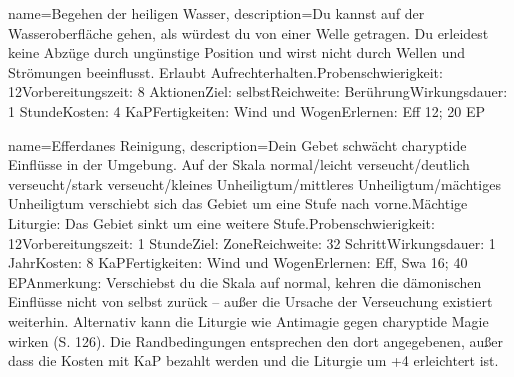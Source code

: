 {
    name={Begehen der heiligen Wasser},
    description={Du kannst auf der Wasseroberfläche gehen, als würdest du von einer Welle getragen. Du erleidest keine Abzüge durch ungünstige Position und wirst nicht durch Wellen und Strömungen beeinflusst. Erlaubt Aufrechterhalten.\newline Probenschwierigkeit: 12\newline Vorbereitungszeit: 8 Aktionen\newline Ziel: selbst\newline Reichweite: Berührung\newline Wirkungsdauer: 1 Stunde\newline Kosten: 4 KaP\newline Fertigkeiten: Wind und Wogen\newline Erlernen: Eff 12; 20 EP}
}


{
    name={Efferdanes Reinigung},
    description={Dein Gebet schwächt charyptide Einflüsse in der Umgebung. Auf der Skala normal/leicht verseucht/deutlich verseucht/stark verseucht/kleines Unheiligtum/mittleres Unheiligtum/mächtiges Unheiligtum verschiebt sich das Gebiet um eine Stufe nach vorne.\newline Mächtige Liturgie: Das Gebiet sinkt um eine weitere Stufe.\newline Probenschwierigkeit: 12\newline Vorbereitungszeit: 1 Stunde\newline Ziel: Zone\newline Reichweite: 32 Schritt\newline Wirkungsdauer: 1 Jahr\newline Kosten: 8 KaP\newline Fertigkeiten: Wind und Wogen\newline Erlernen: Eff, Swa 16; 40 EP\newline Anmerkung: Verschiebst du die Skala auf normal, kehren die dämonischen Einflüsse nicht von selbst zurück – außer die Ursache der Verseuchung existiert weiterhin. Alternativ kann die Liturgie wie Antimagie gegen charyptide Magie wirken (S. 126). Die Randbedingungen entsprechen den dort angegebenen, außer dass die Kosten mit KaP bezahlt werden und die Liturgie um +4 erleichtert ist.}
}


